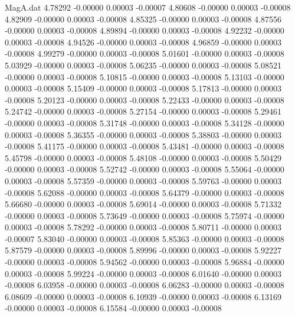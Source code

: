 \begin{filecontents}{MagA.dat}
   4.78292   -0.00000    0.00003   -0.00007
   4.80608   -0.00000    0.00003   -0.00008
   4.82909   -0.00000    0.00003   -0.00008
   4.85325   -0.00000    0.00003   -0.00008
   4.87556   -0.00000    0.00003   -0.00008
   4.89894   -0.00000    0.00003   -0.00008
   4.92232   -0.00000    0.00003   -0.00008
   4.94526   -0.00000    0.00003   -0.00008
   4.96859   -0.00000    0.00003   -0.00008
   4.99279   -0.00000    0.00003   -0.00008
   5.01601   -0.00000    0.00003   -0.00008
   5.03929   -0.00000    0.00003   -0.00008
   5.06235   -0.00000    0.00003   -0.00008
   5.08521   -0.00000    0.00003   -0.00008
   5.10815   -0.00000    0.00003   -0.00008
   5.13103   -0.00000    0.00003   -0.00008
   5.15409   -0.00000    0.00003   -0.00008
   5.17813   -0.00000    0.00003   -0.00008
   5.20123   -0.00000    0.00003   -0.00008
   5.22433   -0.00000    0.00003   -0.00008
   5.24742   -0.00000    0.00003   -0.00008
   5.27154   -0.00000    0.00003   -0.00008
   5.29461   -0.00000    0.00003   -0.00008
   5.31748   -0.00000    0.00003   -0.00008
   5.34128   -0.00000    0.00003   -0.00008
   5.36355   -0.00000    0.00003   -0.00008
   5.38803   -0.00000    0.00003   -0.00008
   5.41175   -0.00000    0.00003   -0.00008
   5.43481   -0.00000    0.00003   -0.00008
   5.45798   -0.00000    0.00003   -0.00008
   5.48108   -0.00000    0.00003   -0.00008
   5.50429   -0.00000    0.00003   -0.00008
   5.52742   -0.00000    0.00003   -0.00008
   5.55064   -0.00000    0.00003   -0.00008
   5.57359   -0.00000    0.00003   -0.00008
   5.59763   -0.00000    0.00003   -0.00008
   5.62088   -0.00000    0.00003   -0.00008
   5.64379   -0.00000    0.00003   -0.00008
   5.66680   -0.00000    0.00003   -0.00008
   5.69014   -0.00000    0.00003   -0.00008
   5.71332   -0.00000    0.00003   -0.00008
   5.73649   -0.00000    0.00003   -0.00008
   5.75974   -0.00000    0.00003   -0.00008
   5.78292   -0.00000    0.00003   -0.00008
   5.80711   -0.00000    0.00003   -0.00007
   5.83040   -0.00000    0.00003   -0.00008
   5.85363   -0.00000    0.00003   -0.00008
   5.87579   -0.00000    0.00003   -0.00008
   5.89996   -0.00000    0.00003   -0.00008
   5.92227   -0.00000    0.00003   -0.00008
   5.94562   -0.00000    0.00003   -0.00008
   5.96884   -0.00000    0.00003   -0.00008
   5.99224   -0.00000    0.00003   -0.00008
   6.01640   -0.00000    0.00003   -0.00008
   6.03958   -0.00000    0.00003   -0.00008
   6.06283   -0.00000    0.00003   -0.00008
   6.08609   -0.00000    0.00003   -0.00008
   6.10939   -0.00000    0.00003   -0.00008
   6.13169   -0.00000    0.00003   -0.00008
   6.15584   -0.00000    0.00003   -0.00008

\end{filecontents}

